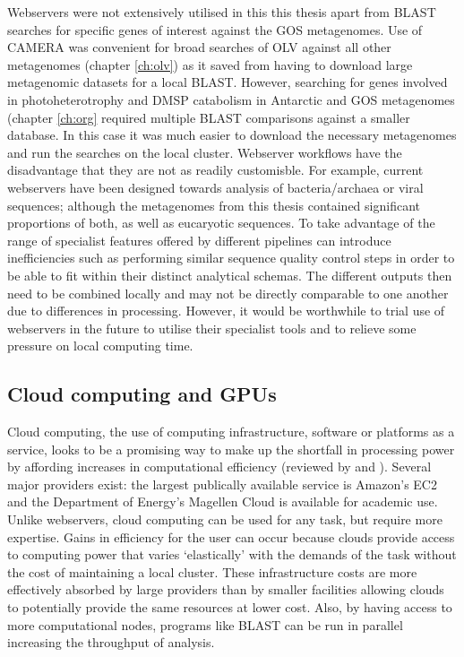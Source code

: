 Webservers were not extensively utilised in this this thesis apart from \acs{BLAST} searches for specific genes of interest against the \acs{GOS} metagenomes.
Use of \ac{CAMERA} was convenient for broad searches of \ac{OLV} against all other metagenomes (chapter \ref{ch:olv}) as it saved from having to download large metagenomic datasets for a local \acs{BLAST}.
However, searching for genes involved in photoheterotrophy and \ac{DMSP} catabolism in Antarctic and \acs{GOS} metagenomes (chapter \ref{ch:org} required multiple \acs{BLAST} comparisons against a smaller database.
In this case it was much easier to download the necessary metagenomes and run the searches on the local cluster.
Webserver workflows have the disadvantage that they are not as readily customisble.
For example, current webservers have been designed towards analysis of bacteria/archaea or viral sequences; although the metagenomes from this thesis contained significant proportions of both, as well as eucaryotic sequences.
To take advantage of the range of specialist features offered by different pipelines can introduce inefficiencies such as performing similar sequence quality control steps in order to be able to fit within their distinct analytical schemas. 
The different outputs then need to be combined locally and may not be directly comparable to one another due to differences in processing.
However, it would be worthwhile to trial use of webservers in the future to utilise their specialist tools and to relieve some pressure on local computing time.

\subsection{Cloud computing and \acs{GPU}s}
Cloud computing, the use of computing infrastructure, software or platforms as a service, looks to be a promising way to make up the shortfall in processing power by affording increases in computational efficiency (reviewed by \citet{Schatz2010} and \citet{Thakur2012}).
Several major providers exist: the largest publically available service is Amazon's \ac{EC2} and the Department of Energy's Magellen Cloud is available for academic use.
Unlike webservers, cloud computing can be used for any task, but require more expertise.
Gains in efficiency for the user can occur because clouds provide access to computing power that varies `elastically' with the demands of the task without the cost of maintaining a local cluster.
These infrastructure costs are more effectively absorbed by large providers than by smaller facilities allowing clouds to potentially provide the same resources at lower cost.
Also, by having access to more computational nodes, programs like \acs{BLAST} can be run in parallel increasing the throughput of analysis.

